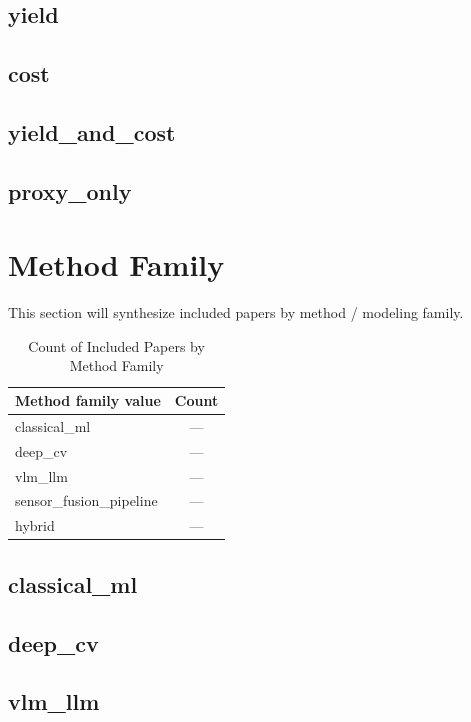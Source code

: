 \documentclass[lettersize,journal]{IEEEtran}
\begin{document}
\subsection{yield}

\subsection{cost}

\subsection{yield\_and\_cost}

\subsection{proxy\_only}


\section{Method Family}
This section will synthesize included papers by method / modeling family.

\begin{table}[H]
\caption{Count of Included Papers by Method Family}
\label{tab:method_family_counts}
\centering
\begin{tabular}{|l|c|}
\hline
Method family value & Count\\
\hline
classical\_ml & ---\\
deep\_cv & ---\\
vlm\_llm & ---\\
sensor\_fusion\_pipeline & ---\\
hybrid & ---\\
\hline
\end{tabular}
\end{table}

\subsection{classical\_ml}

\subsection{deep\_cv}

\subsection{vlm\_llm}
\end{document}
